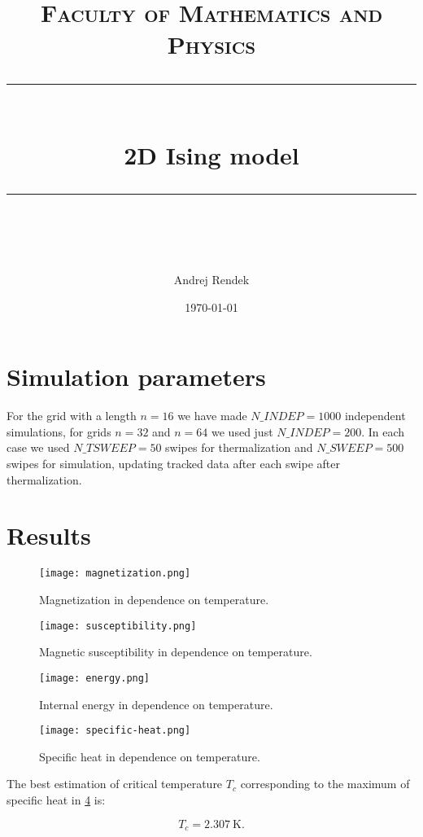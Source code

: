 \documentclass[11pt]{scrartcl} %
\title{	
	\normalfont\normalsize
	\textsc{Faculty of Mathematics and Physics}\\ %
	\vspace{25pt} %
	\rule{\linewidth}{0.5pt}\\ %
	\vspace{20pt} %
	{\huge 2D Ising model}\\ %
	\vspace{12pt} %
	\rule{\linewidth}{2pt}\\ %
	\vspace{12pt} %
}
\author{\LARGE Andrej Rendek} %
\date{\normalsize\today} %
\begin{document}
\maketitle

\section{Simulation parameters}

For the grid with a length $n = 16$ we have made $N\_INDEP = 1000$ independent simulations, for grids $n = 32$ and $n = 64$ we used just $N\_INDEP = 200$. In each case we used $N\_TSWEEP = 50$ swipes for thermalization and $N\_SWEEP = 500$ swipes for simulation, updating tracked data after each swipe after thermalization.

\section{Results} 

\begin{figure}[h] 
	\centering
	\texttt{[image: magnetization.png]} 
	\caption{Magnetization in dependence on temperature.}
	\label{fig:magnetization}
\end{figure}


\begin{figure}[h] 
	\centering
	\texttt{[image: susceptibility.png]} 
	\caption{Magnetic susceptibility in dependence on temperature.}
	\label{fig:susceptibility}
\end{figure}

\begin{figure}[h] 
	\centering
	\texttt{[image: energy.png]} 
	\caption{Internal energy in dependence on temperature.}
	\label{fig:energy}
\end{figure}

\begin{figure}[h] 
	\centering
	\texttt{[image: specific-heat.png]} 
	\caption{Specific heat in dependence on temperature.}
	\label{fig:specific-heat}
\end{figure}

The best estimation of critical temperature $T_c$ corresponding to the maximum of specific heat in \ref{fig:specific-heat} is:

\begin{equation*}
	T_c = \SI{2.307}{\kelvin}.
\end{equation*}
\end{document}
